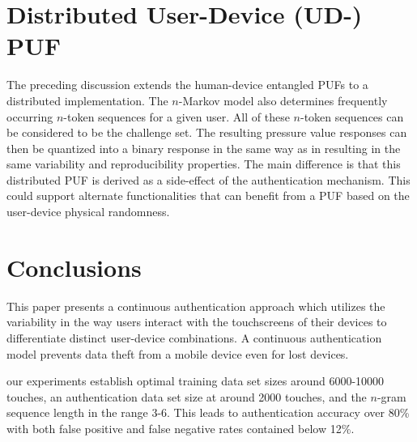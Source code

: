 \documentclass{acm_proc_article-sp}
\begin{document}
\section{Distributed User-Device (UD-) PUF}
\label{sec:PUF}
The preceding discussion extends the human-device entangled PUFs \cite{ScheelTyagi15} to a distributed
implementation. The $n$-Markov model also determines frequently occurring $n$-token sequences for a
given user. All of these $n$-token sequences can be considered to be the challenge set. The resulting
pressure value responses can then be quantized into a binary response in the same way as in 
\cite{ScheelTyagi15} resulting in the same variability and reproducibility properties. The main 
difference is that this distributed PUF is derived as a side-effect of the authentication mechanism.
This could support alternate functionalities that can benefit from a PUF based on the user-device 
physical randomness.

\section{Conclusions}
\label{sec:conclusions}
This paper presents a continuous authentication approach which utilizes the variability in the way users interact with the touchscreens of their devices to differentiate distinct user-device combinations. 
A continuous authentication model prevents data theft from a mobile device even for lost devices.

our experiments establish optimal training data set sizes around 6000-10000 touches, an authentication
data set size at around 2000 touches, and the $n$-gram sequence length in the range 3-6. This leads to
authentication accuracy over 80\% with both false positive and false negative rates contained
below 12\%.





\end{document}
